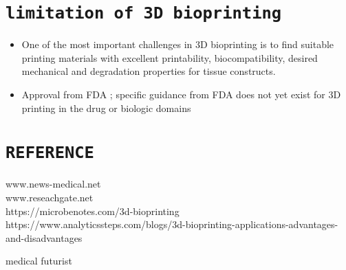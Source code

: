 \documentclass[11pt]{article}
\begin{document}
\section{\Large\texttt{limitation of 3D bioprinting}}
\begin{itemize}
\item  One of the most important challenges in 3D bioprinting is to find suitable printing materials with excellent printability, biocompatibility, desired mechanical and degradation properties for tissue constructs.\\
\item Approval from FDA ; specific guidance from FDA does not yet exist for 3D printing in the drug or biologic domains

\end{itemize}


\pagebreak
\section{\Large\texttt{REFERENCE}}
www.news-medical.net\\
www.reseachgate.net\\

 https://microbenotes.com/3d-bioprinting\\
 
https://www.analyticssteps.com/blogs/3d-bioprinting-applications-advantages-and-disadvantages

medical futurist
\end{document}
